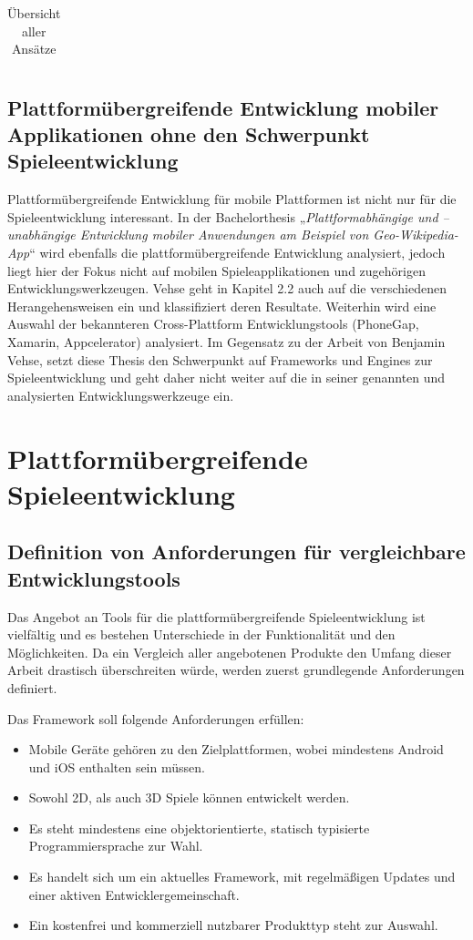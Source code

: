 \begin{table}[htbp]
{\begin{tabular}{|c|c|p{5cm}|p{6cm}|p{}|}
		\end{tabular}
	}
	\caption{Übersicht aller Ansätze}
	\label{table_all_approaches}
\end{table}

\section{Plattformübergreifende Entwicklung mobiler Applikationen ohne den Schwerpunkt Spieleentwicklung}
Plattformübergreifende Entwicklung für mobile Plattformen ist nicht nur für die Spieleentwicklung interessant.
In der Bachelorthesis „\textit{Plattformabhängige und –unabhängige Entwicklung mobiler Anwendungen am Beispiel von Geo-Wikipedia-App}“ \citep{cross_plattform_development_vehse} wird ebenfalls die plattformübergreifende Entwicklung analysiert, jedoch liegt hier der Fokus nicht auf mobilen Spieleapplikationen und zugehörigen Entwicklungswerkzeugen. Vehse geht in Kapitel 2.2 auch auf die verschiedenen Herangehensweisen ein und klassifiziert deren Resultate. Weiterhin wird eine Auswahl der bekannteren Cross-Plattform Entwicklungstools (PhoneGap, Xamarin, Appcelerator) analysiert. Im Gegensatz zu der Arbeit von Benjamin Vehse, setzt diese Thesis den Schwerpunkt auf Frameworks und Engines zur Spieleentwicklung und geht daher nicht weiter auf die in seiner genannten und analysierten Entwicklungswerkzeuge ein.


\chapter{Plattformübergreifende Spieleentwicklung}

\section{Definition von Anforderungen für vergleichbare Entwicklungstools}
Das Angebot an Tools für die plattformübergreifende Spieleentwicklung ist vielfältig und es bestehen Unterschiede in der Funktionalität und den Möglichkeiten. Da ein Vergleich aller angebotenen Produkte den Umfang dieser Arbeit drastisch überschreiten würde, werden zuerst grundlegende Anforderungen definiert.
 
\bigskip
Das Framework soll folgende Anforderungen erfüllen:
\begin{itemize}
	\item Mobile Geräte gehören zu den Zielplattformen, wobei mindestens Android und iOS enthalten sein müssen.
	\item Sowohl 2D, als auch 3D Spiele können entwickelt werden.
	\item Es steht mindestens eine objektorientierte, statisch typisierte Programmiersprache zur Wahl.
	\item Es handelt sich um ein aktuelles Framework, mit regelmäßigen Updates und einer aktiven Entwicklergemeinschaft.
	\item Ein kostenfrei und kommerziell nutzbarer Produkttyp steht zur Auswahl.
\end{itemize}

